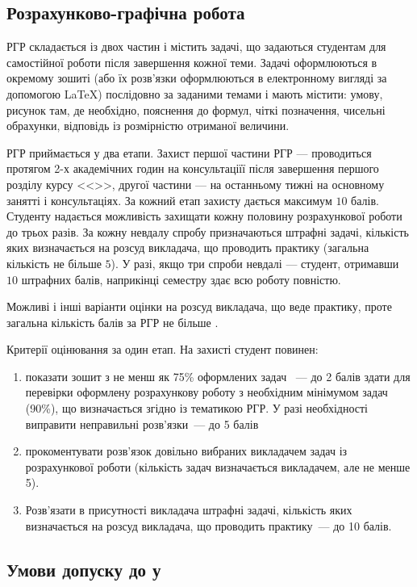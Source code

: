 \documentclass{Syllabus}
\begin{document}
\subsection*{Розрахунково-графічна робота}


РГР складається із двох частин і містить задачі, що задаються студентам для самостійної роботи після завершення кожної теми. Задачі оформлюються в окремому зошиті (або їх розв'язки оформлюються в електронному вигляді за допомогою \LaTeX{}) послідовно за заданими темами і мають містити: умову, рисунок там, де необхідно, пояснення до формул, чіткі позначення, чисельні обрахунки, відповідь із розмірністю отриманої величини.

РГР приймається у два етапи. Захист першої частини РГР --- проводиться протягом 2-х академічних годин на консультаціїї після завершення першого розділу курсу <<\discipline>>, другої частини --- на останньому тижні на основному занятті і консультаціях. За кожний етап захисту дається максимум $10$ балів. Студенту надається можливість захищати кожну половину розрахункової роботи до трьох разів. За кожну невдалу спробу призначаються штрафні задачі, кількість яких визначається на розсуд викладача, що проводить практику (загальна кількість не більше $5$). У разі, якщо три спроби невдалі --- студент, отримавши $10$ штрафних балів, наприкінці семестру здає всю роботу повністю.


Можливі і інші варіанти оцінки на розсуд викладача, що веде практику, проте загальна кількість балів за РГР не більше \rgrBal.

Критерії оцінювання за один етап. На захисті студент повинен:
\begin{enumerate}[label=$\bullet$]
\item показати зошит з не менш як 75\% оформлених задач~ --- до 2 балів
здати для перевірки оформлену розрахункову роботу з необхідним мінімумом задач (90\%), що визначається згідно із тематикою РГР. У разі необхідності виправити неправильні розв’язки~--- до 5 балів
\item прокоментувати розв’язок довільно вибраних викладачем задач із розрахункової роботи (кількість задач визначається викладачем, але не менше 5).
\item  Розв’язати в присутності викладача штрафні задачі, кількість яких визначається на розсуд викладача, що проводить практику~--- до 10 балів.
\end{enumerate}


\subsection*{Умови допуску до \control у}
\end{document}
